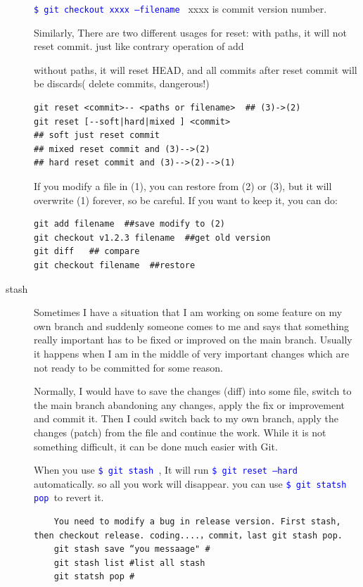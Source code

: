 \documentclass[a4paper,12pt,twoside]{book}
\newcommand{\linuxcommand}[1]{\texttt{\textcolor{blue}{\$ #1 \Pisymbol{psy}{191}}}}
\begin{document}
\begin{description}
\linuxcommand{git checkout xxxx  --filename} xxxx is commit version number.

 Similarly, There are two different usages for reset: with paths, it will not reset commit. just like contrary operation of add \par
 
 without paths, it will reset HEAD, and all commits after reset commit will be discards( delete commits, dangerous!) \par
\begin{verbatim}
git reset <commit>-- <paths or filename>  ## (3)->(2)
git reset [--soft|hard|mixed ] <commit>
## soft just reset commit
## mixed reset commit and (3)-->(2)
## hard reset commit and (3)-->(2)-->(1)
\end{verbatim}


If you modify a file in (1), you can restore from (2) or (3), but it will overwrite (1) forever, so be careful. If you
want to keep it, you can do:
\begin{verbatim}
git add filename  ##save modify to (2)
git checkout v1.2.3 filename  ##get old version
git diff   ## compare
git checkout filename  ##restore
\end{verbatim}


\item[stash]
 Sometimes I have a situation that I am working on some feature on my own branch and suddenly someone
    comes to me and says that something really important has to be fixed or improved on the main branch.
    Usually it happens when I am in the middle of very important changes which are not ready to be committed
    for some reason. \par

Normally, I would have to save the changes (diff) into some file, switch to the main branch abandoning any
changes, apply the fix or improvement and commit it. Then I could switch back to my own branch, apply the
changes (patch) from the file and continue the work. While it is not something difficult, it can be done much
easier with Git. \par

When you use \linuxcommand{git stash}, It will run \linuxcommand{git reset --hard} automatically. so all you
work will disappear. you can use \linuxcommand{git statsh pop }to revert it.

    \begin{verbatim}
    You need to modify a bug in release version. First stash, then checkout release. coding....，commit，last git stash pop.
    git stash save “you messaage" #
    git stash list #list all stash
    git statsh pop #
    \end{verbatim}



\end{description}
\end{document}
